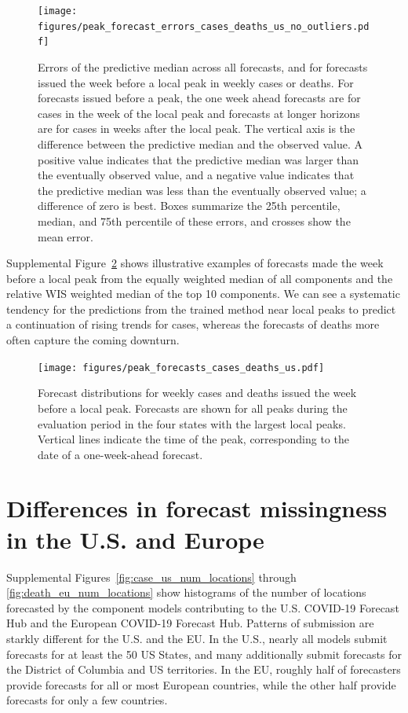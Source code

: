 \documentclass{article}
\begin{document}
\begin{figure}[H]
  \texttt{[image: figures/peak\_forecast\_errors\_cases\_deaths\_us\_no\_outliers.pdf]}
  \caption{Errors of the predictive median across all forecasts, and for forecasts issued the week before a local peak in weekly cases or deaths. For forecasts issued before a peak, the one week ahead forecasts are for cases in the week of the local peak and forecasts at longer horizons are for cases in weeks after the local peak. The vertical axis is the difference between the predictive median and the observed value. A positive value indicates that the predictive median was larger than the eventually observed value, and a negative value indicates that the predictive median was less than the eventually observed value; a difference of zero is best. Boxes summarize the 25th percentile, median, and 75th percentile of these errors, and crosses show the mean error.}
  \label{fig:peak_case_death_forecast_errors_by_horizon_central_only}
\end{figure}

Supplemental Figure~\ref{fig:peak_case_death_forecast_examples} shows illustrative examples of forecasts made the week before a local peak from the equally weighted median of all components and the relative WIS weighted median of the top 10 components. We can see a systematic tendency for the predictions from the trained method near local peaks to predict a continuation of rising trends for cases, whereas the forecasts of deaths more often capture the coming downturn.

\begin{figure}
  \texttt{[image: figures/peak\_forecasts\_cases\_deaths\_us.pdf]}
  \caption{Forecast distributions for weekly cases and deaths issued the week before a local peak. Forecasts are shown for all peaks during the evaluation period in the four states with the largest local peaks. Vertical lines indicate the time of the peak, corresponding to the date of a one-week-ahead forecast.}
  \label{fig:peak_case_death_forecast_examples}
\end{figure}

\section{Differences in forecast missingness in the U.S. and Europe}

Supplemental Figures~\ref{fig:case_us_num_locations} through \ref{fig:death_eu_num_locations} show histograms of the number of locations forecasted by the component models contributing to the U.S. COVID-19 Forecast Hub and the European COVID-19 Forecast Hub. Patterns of submission are starkly different for the U.S. and the EU. In the U.S., nearly all models submit forecasts for at least the 50 US States, and many additionally submit forecasts for the District of Columbia and US territories. In the EU, roughly half of forecasters provide forecasts for all or most European countries, while the other half provide forecasts for only a few countries.
\end{document}
